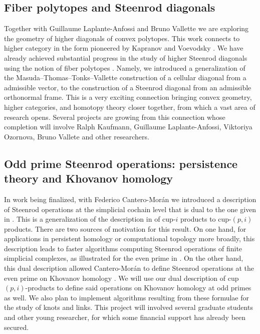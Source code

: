 \subsection{Fiber polytopes and Steenrod diagonals} \label{ss:polytopes}

Together with Guillaume Laplante-Anfossi and Bruno Vallette we are exploring the geometry of higher diagonals of convex polytopes.
This work connects to higher category in the form pioneered by Kapranov and Voevodsky \cite{kapranov1991polycategories}.
We have already achieved substantial progress in the study of higher Steenrod diagonals using the notion of fiber polytopes \cite{billera1992fiber.polytopes}.
Namely, we introduced a generalization of the Masuda--Thomas--Tonks--Vallette construction of a cellular diagonal from a admissible vector, to the construction of a Steenrod diagonal from an admissible orthonormal frame.
This is a very exciting connection bringing convex geometry, higher categories, and homotopy theory closer together, from which a vast area of research opens.
Several projects are growing from this connection whose completion will involve Ralph Kaufmann, Guillaume Laplante-Anfossi, Viktoriya Ozornova, Bruno Vallete and other researchers.

\subsection{Odd prime Steenrod operations: persistence theory and Khovanov homology} \label{ss:odd prime steenrod operations}

In work being finalized, with Federico Cantero-Mor\'{a}n we introduced a description of Steenrod operations at the simplicial cochain level that is dual to the one given in \cite{medina2021maysteenrod}.
This is a generalization of the description in \cite{medina2021newformulas} of cup-$i$ products to cup-$(p,i)$ products.
There are two sources of motivation for this result.
On one hand, for applications in persistent homology or computational topology more broadly, this description leads to faster algorithms computing Steenrod operations of finite simplicial complexes, as illustrated for the even prime in \cite{medina2021newformulas}.
On the other hand, this dual description allowed Cantero-Mor\'an to define Steenrod operations at the even prime on Khovanov homology \cite{cantero-moran2020khovanov}.
We will use our dual description of cup $(p,i)$-products to define said operations on Khovanov homology at odd primes as well.
We also plan to implement algorithms resulting from these formulae for the study of knots and links.
This project will involved several graduate students and other young researcher, for which some financial support has already been secured.

